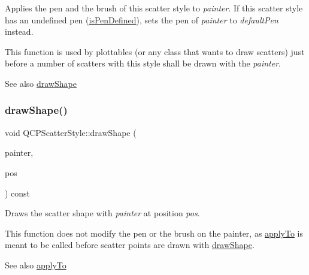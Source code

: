 Applies the pen and the brush of this scatter style to {\itshape painter}. If this scatter style has an undefined pen (\mbox{\hyperlink{class_q_c_p_scatter_style_a47077eb6450fe9a788f833e4ec1b1d5a}{is\+Pen\+Defined}}), sets the pen of {\itshape painter} to {\itshape default\+Pen} instead.

This function is used by plottables (or any class that wants to draw scatters) just before a number of scatters with this style shall be drawn with the {\itshape painter}.

\begin{DoxySeeAlso}{See also}
\mbox{\hyperlink{class_q_c_p_scatter_style_a2b3964961b6cbfbc87be6e1e3a6f3c96}{draw\+Shape}} 
\end{DoxySeeAlso}
\mbox{\label{class_q_c_p_scatter_style_a2b3964961b6cbfbc87be6e1e3a6f3c96}} 
\subsubsection{\texorpdfstring{draw\+Shape()}{drawShape()}\hspace{0.1cm}{\footnotesize\ttfamily [1/2]}}
{\footnotesize\ttfamily void Q\+C\+P\+Scatter\+Style\+::draw\+Shape (\begin{DoxyParamCaption}\item[{\mbox{\hyperlink{class_q_c_p_painter}{Q\+C\+P\+Painter}} $\ast$}]{painter,  }\item[{Q\+PointF}]{pos }\end{DoxyParamCaption}) const}

Draws the scatter shape with {\itshape painter} at position {\itshape pos}.

This function does not modify the pen or the brush on the painter, as \mbox{\hyperlink{class_q_c_p_scatter_style_afd8044ece445300499ca0dc164821e0f}{apply\+To}} is meant to be called before scatter points are drawn with \mbox{\hyperlink{class_q_c_p_scatter_style_a2b3964961b6cbfbc87be6e1e3a6f3c96}{draw\+Shape}}.

\begin{DoxySeeAlso}{See also}
\mbox{\hyperlink{class_q_c_p_scatter_style_afd8044ece445300499ca0dc164821e0f}{apply\+To}} 
\end{DoxySeeAlso}
\mbox{\label{class_q_c_p_scatter_style_a95c297b114c77c22428ef40f54620ddf}} 
